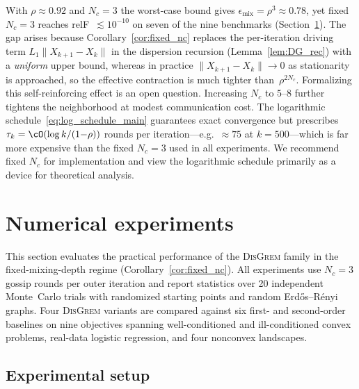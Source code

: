 \documentclass[review,onefignum,onetabnum]{siamart171218}
\begin{document}
\begin{remark}\label{rem:practical_implications}
With $\rho\approx 0.92$ and $N_c=3$ the worst-case bound gives
$\epsilon_{\mathrm{mix}}=\rho^3\approx 0.78$, yet fixed $N_c{=}3$
reaches relF~$\lesssim 10^{-10}$ on seven of the nine benchmarks
(Section~\ref{sec:experiments}).
The gap arises because Corollary~\ref{cor:fixed_nc} replaces the
per-iteration driving term $L_1\|X_{k+1}{-}X_k\|$ in the
dispersion recursion (Lemma~\ref{lem:DG_rec}) with a \emph{uniform}
upper bound, whereas in practice
$\|X_{k+1}{-}X_k\|\to 0$ as stationarity is approached, so the
effective contraction is much tighter than~$\rho^{2N_c}$.
Formalizing this self-reinforcing effect is an open question.
Increasing $N_c$ to $5$--$8$ further tightens the neighborhood at
modest communication cost.
The logarithmic schedule~\eqref{eq:log_schedule_main} guarantees
exact convergence but prescribes $\tau_k=\cO(\log k/(1{-}\rho))$
rounds per iteration---e.g.\ ${\approx}75$ at $k{=}500$---which is
far more expensive than the fixed $N_c{=}3$ used in all experiments.
We recommend fixed $N_c$ for implementation and view the
logarithmic schedule primarily as a device for theoretical analysis.
\end{remark}




\section{Numerical experiments}\label{sec:experiments}

	This section evaluates the practical performance of the
	\textsc{DisGrem} family in the fixed-mixing-depth regime
	(Corollary~\ref{cor:fixed_nc}).
	All experiments use $N_c=3$ gossip rounds per outer iteration and
	report statistics over 20 independent Monte~Carlo trials with
	randomized starting points and random Erd\H{o}s--R\'{e}nyi graphs.
	Four \textsc{DisGrem} variants are compared against six first- and
	second-order baselines on nine objectives spanning well-conditioned
	and ill-conditioned convex problems, real-data logistic regression,
	and four nonconvex landscapes.
	
	\subsection{Experimental setup}\label{ssec:setup}
	
\end{document}
